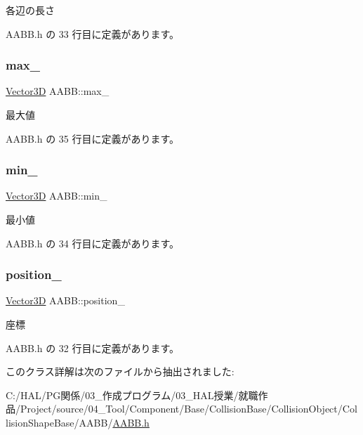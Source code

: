 各辺の長さ 



 A\+A\+B\+B.\+h の 33 行目に定義があります。

\mbox{\label{class_a_a_b_b_a7f8dca79cab056729bde7139b219fcbe}} 
\subsubsection{\texorpdfstring{max\+\_\+}{max\_}}
{\footnotesize\ttfamily \mbox{\hyperlink{class_vector3_d}{Vector3D}} A\+A\+B\+B\+::max\+\_\+\hspace{0.3cm}{\ttfamily [private]}}



最大値 



 A\+A\+B\+B.\+h の 35 行目に定義があります。

\mbox{\label{class_a_a_b_b_a682f7bc02fc950a24ce8a8e512e4eb52}} 
\subsubsection{\texorpdfstring{min\+\_\+}{min\_}}
{\footnotesize\ttfamily \mbox{\hyperlink{class_vector3_d}{Vector3D}} A\+A\+B\+B\+::min\+\_\+\hspace{0.3cm}{\ttfamily [private]}}



最小値 



 A\+A\+B\+B.\+h の 34 行目に定義があります。

\mbox{\label{class_a_a_b_b_a3ca25dc046fa31d1baafa8c8a1174302}} 
\subsubsection{\texorpdfstring{position\+\_\+}{position\_}}
{\footnotesize\ttfamily \mbox{\hyperlink{class_vector3_d}{Vector3D}} A\+A\+B\+B\+::position\+\_\+\hspace{0.3cm}{\ttfamily [private]}}



座標 



 A\+A\+B\+B.\+h の 32 行目に定義があります。



このクラス詳解は次のファイルから抽出されました\+:\begin{DoxyCompactItemize}
\item 
C\+:/\+H\+A\+L/\+P\+G関係/03\+\_\+作成プログラム/03\+\_\+\+H\+A\+L授業/就職作品/\+Project/source/04\+\_\+\+Tool/\+Component/\+Base/\+Collision\+Base/\+Collision\+Object/\+Collision\+Shape\+Base/\+A\+A\+B\+B/\mbox{\hyperlink{_a_a_b_b_8h}{A\+A\+B\+B.\+h}}\end{DoxyCompactItemize}

